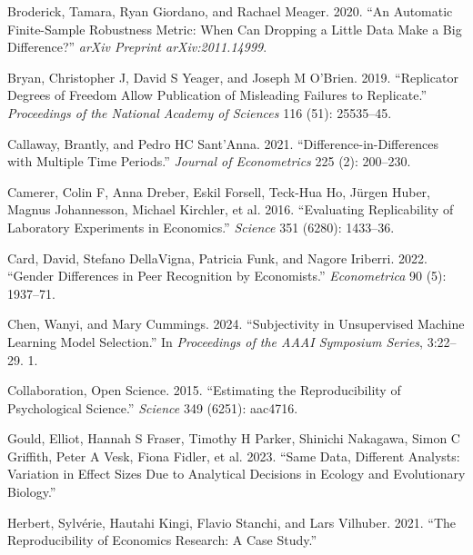 \documentclass[
  letterpaper,
  DIV=11,
  numbers=noendperiod]{scrartcl}
\newlength{\cslhangindent}
\newlength{\cslentryspacingunit} %
\newenvironment{CSLReferences}[2] %
 {%
  \setlength{\parindent}{0pt}
  \ifodd #1
  \let\oldpar\par
  \def\par{\hangindent=\cslhangindent\oldpar}
  \fi
  \setlength{\parskip}{#2\cslentryspacingunit}
 }%
 {}
\begin{document}
\begin{CSLReferences}{1}{0}
\leavevmode{}%
Broderick, Tamara, Ryan Giordano, and Rachael Meager. 2020. {``An
Automatic Finite-Sample Robustness Metric: When Can Dropping a Little
Data Make a Big Difference?''} \emph{arXiv Preprint arXiv:2011.14999}.

\leavevmode{}%
Bryan, Christopher J, David S Yeager, and Joseph M O'Brien. 2019.
{``Replicator Degrees of Freedom Allow Publication of Misleading
Failures to Replicate.''} \emph{Proceedings of the National Academy of
Sciences} 116 (51): 25535--45.

\leavevmode{}%
Callaway, Brantly, and Pedro HC Sant'Anna. 2021.
{``Difference-in-Differences with Multiple Time Periods.''}
\emph{Journal of Econometrics} 225 (2): 200--230.

\leavevmode{}%
Camerer, Colin F, Anna Dreber, Eskil Forsell, Teck-Hua Ho, Jürgen Huber,
Magnus Johannesson, Michael Kirchler, et al. 2016. {``Evaluating
Replicability of Laboratory Experiments in Economics.''} \emph{Science}
351 (6280): 1433--36.

\leavevmode{}%
Card, David, Stefano DellaVigna, Patricia Funk, and Nagore Iriberri.
2022. {``Gender Differences in Peer Recognition by Economists.''}
\emph{Econometrica} 90 (5): 1937--71.

\leavevmode{}%
Chen, Wanyi, and Mary Cummings. 2024. {``Subjectivity in Unsupervised
Machine Learning Model Selection.''} In \emph{Proceedings of the AAAI
Symposium Series}, 3:22--29. 1.

\leavevmode{}%
Collaboration, Open Science. 2015. {``Estimating the Reproducibility of
Psychological Science.''} \emph{Science} 349 (6251): aac4716.

\leavevmode{}%
Gould, Elliot, Hannah S Fraser, Timothy H Parker, Shinichi Nakagawa,
Simon C Griffith, Peter A Vesk, Fiona Fidler, et al. 2023. {``Same Data,
Different Analysts: Variation in Effect Sizes Due to Analytical
Decisions in Ecology and Evolutionary Biology.''}

\leavevmode{}%
Herbert, Sylvérie, Hautahi Kingi, Flavio Stanchi, and Lars Vilhuber.
2021. {``The Reproducibility of Economics Research: A Case Study.''}


\end{CSLReferences}
\end{document}
